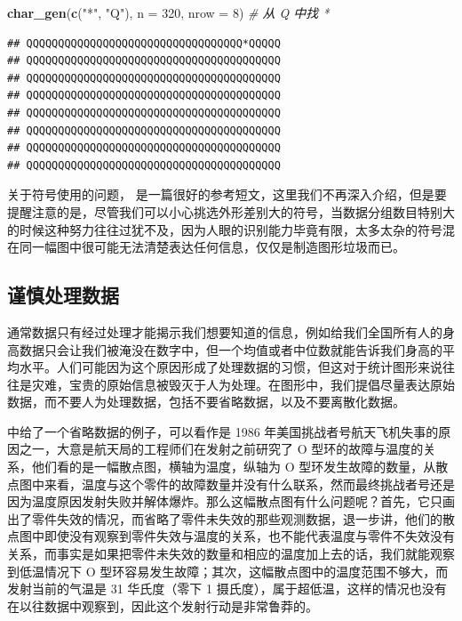 \documentclass[
  b5paper,
  UTF8,twoside]{book}
\newenvironment{Shaded}{\begin{snugshade}}{\end{snugshade}}
\newcommand{\AttributeTok}[1]{\textcolor[rgb]{0.13,0.29,0.53}{#1}}
\newcommand{\CommentTok}[1]{\textcolor[rgb]{0.56,0.35,0.01}{\textit{#1}}}
\newcommand{\DecValTok}[1]{\textcolor[rgb]{0.00,0.00,0.81}{#1}}
\newcommand{\FunctionTok}[1]{\textcolor[rgb]{0.13,0.29,0.53}{\textbf{#1}}}
\newcommand{\NormalTok}[1]{#1}
\newcommand{\StringTok}[1]{\textcolor[rgb]{0.31,0.60,0.02}{#1}}
\begin{document}
\begin{Shaded}
\begin{Highlighting}[]
\FunctionTok{char\_gen}\NormalTok{(}\FunctionTok{c}\NormalTok{(}\StringTok{"*"}\NormalTok{, }\StringTok{"Q"}\NormalTok{), }\AttributeTok{n =} \DecValTok{320}\NormalTok{, }\AttributeTok{nrow =} \DecValTok{8}\NormalTok{) }\CommentTok{\# 从 Q 中找 *}
\end{Highlighting}
\end{Shaded}

\begin{verbatim}
## QQQQQQQQQQQQQQQQQQQQQQQQQQQQQQQQQQ*QQQQQ
## QQQQQQQQQQQQQQQQQQQQQQQQQQQQQQQQQQQQQQQQ
## QQQQQQQQQQQQQQQQQQQQQQQQQQQQQQQQQQQQQQQQ
## QQQQQQQQQQQQQQQQQQQQQQQQQQQQQQQQQQQQQQQQ
## QQQQQQQQQQQQQQQQQQQQQQQQQQQQQQQQQQQQQQQQ
## QQQQQQQQQQQQQQQQQQQQQQQQQQQQQQQQQQQQQQQQ
## QQQQQQQQQQQQQQQQQQQQQQQQQQQQQQQQQQQQQQQQ
## QQQQQQQQQQQQQQQQQQQQQQQQQQQQQQQQQQQQQQQQ
\end{verbatim}

关于符号使用的问题，\citet{Robinson03} 是一篇很好的参考短文，这里我们不再深入介绍，但是要提醒注意的是，尽管我们可以小心挑选外形差别大的符号，当数据分组数目特别大的时候这种努力往往过犹不及，因为人眼的识别能力毕竟有限，太多太杂的符号混在同一幅图中很可能无法清楚表达任何信息，仅仅是制造图形垃圾而已。

\subsection{谨慎处理数据}\label{subsec:data-processing}

通常数据只有经过处理才能揭示我们想要知道的信息，例如给我们全国所有人的身高数据只会让我们被淹没在数字中，但一个均值或者中位数就能告诉我们身高的平均水平。人们可能因为这个原因形成了处理数据的习惯，但这对于统计图形来说往往是灾难，宝贵的原始信息被毁灭于人为处理。在图形中，我们提倡尽量表达原始数据，而不要人为处理数据，包括不要省略数据，以及不要离散化数据。

\citet{Cleveland85} 中给了一个省略数据的例子，可以看作是 1986 年美国挑战者号航天飞机失事的原因之一，大意是航天局的工程师们在发射之前研究了 O 型环的故障与温度的关系，他们看的是一幅散点图，横轴为温度，纵轴为 O 型环发生故障的数量，从散点图中来看，温度与这个零件的故障数量并没有什么联系，然而最终挑战者号还是因为温度原因发射失败并解体爆炸。那么这幅散点图有什么问题呢？首先，它只画出了零件失效的情况，而省略了零件未失效的那些观测数据，退一步讲，他们的散点图中即使没有观察到零件失效与温度的关系，也不能代表温度与零件不失效没有关系，而事实是如果把零件未失效的数量和相应的温度加上去的话，我们就能观察到低温情况下 O 型环容易发生故障；其次，这幅散点图中的温度范围不够大，而发射当前的气温是 31 华氏度（零下 1 摄氏度），属于超低温，这样的情况也没有在以往数据中观察到，因此这个发射行动是非常鲁莽的。
\end{document}
